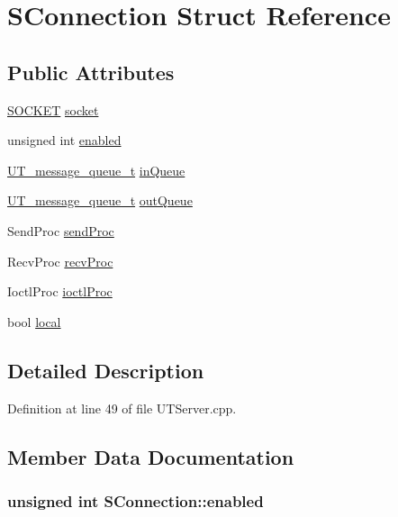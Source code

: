 \hypertarget{struct_s_connection}{
\section{SConnection Struct Reference}
\label{struct_s_connection}
}
\subsection*{Public Attributes}
\begin{CompactItemize}
\item 
\hyperlink{_u_t_net_utils_8h_7d68bb01e985882c1c12dbc3b0468c9a}{SOCKET} \hyperlink{struct_s_connection_2a1b0650f9af35d8d80ce21b2b46d8e3}{socket}
\item 
unsigned int \hyperlink{struct_s_connection_ec756bce5698c043ae1a6f6bd16df5e0}{enabled}
\item 
\hyperlink{struct_u_t__message__queue__t}{UT\_\-message\_\-queue\_\-t} \hyperlink{struct_s_connection_774daaefa5b98373415ac366623f0455}{inQueue}
\item 
\hyperlink{struct_u_t__message__queue__t}{UT\_\-message\_\-queue\_\-t} \hyperlink{struct_s_connection_8cf19075e8f6360e990a7296e98da87b}{outQueue}
\item 
SendProc \hyperlink{struct_s_connection_34cae42592bcf485727a80ef5f4bfd0e}{sendProc}
\item 
RecvProc \hyperlink{struct_s_connection_c1813c487ad059d10a46f406e5bb8dab}{recvProc}
\item 
IoctlProc \hyperlink{struct_s_connection_95a08a4899bcc4204174f9b80444d9c7}{ioctlProc}
\item 
bool \hyperlink{struct_s_connection_5d2664509b2124cbe67ce69805417f77}{local}
\end{CompactItemize}


\subsection{Detailed Description}


Definition at line 49 of file UTServer.cpp.

\subsection{Member Data Documentation}
\hypertarget{struct_s_connection_ec756bce5698c043ae1a6f6bd16df5e0}{
\subsubsection[{enabled}]{\setlength{\rightskip}{0pt plus 5cm}unsigned int {\bf SConnection::enabled}}}
\label{struct_s_connection_ec756bce5698c043ae1a6f6bd16df5e0}




